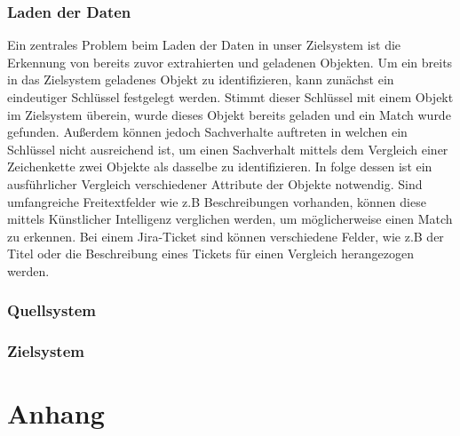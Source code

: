 \documentclass[10pt]{article}
\begin{document}
\subsubsection{Laden der Daten}
Ein zentrales Problem beim Laden der Daten in unser Zielsystem ist die Erkennung von bereits zuvor extrahierten und geladenen Objekten. Um ein breits in das Zielsystem geladenes Objekt zu identifizieren, kann zunächst ein eindeutiger Schlüssel festgelegt werden. Stimmt dieser Schlüssel mit einem Objekt im Zielsystem überein, wurde dieses Objekt bereits geladen und ein Match wurde gefunden. Außerdem können jedoch Sachverhalte auftreten in welchen ein Schlüssel nicht ausreichend ist, um einen Sachverhalt mittels dem Vergleich einer Zeichenkette zwei Objekte als dasselbe zu identifizieren. In folge dessen ist ein ausführlicher Vergleich verschiedener Attribute der Objekte notwendig. Sind umfangreiche Freitextfelder wie z.B Beschreibungen vorhanden, können diese mittels Künstlicher Intelligenz verglichen werden, um möglicherweise einen Match zu erkennen. Bei einem Jira-Ticket sind können verschiedene Felder, wie z.B der Titel oder die Beschreibung eines Tickets für einen Vergleich herangezogen werden.

\subsubsection{Quellsystem}
\subsubsection{Zielsystem}
\subsection{}
\section{Anhang}
\newpage
\end{document}
